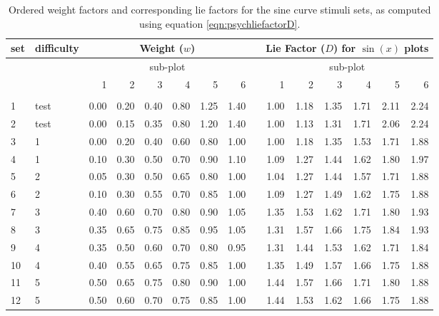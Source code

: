 \documentclass[11pt]{isuthesis}\usepackage[]{graphicx}\usepackage[]{color}
\begin{document}
\begin{table}[ht]
\centering
\caption{\label{tab:w} Ordered weight factors and corresponding lie factors for the sine curve stimuli sets, as computed using equation \ref{eqn:psychliefactorD}.}
\begin{tabular}{llrrrrrrlrrrrrr}
  \hline
set \vphantom{hp}& difficulty & \multicolumn{6}{c}{Weight ($w$)} & & \multicolumn{6}{c}{Lie Factor ($D$) for $\sin(x)$ plots}\\ 
\hline
& & \multicolumn{6}{c}{sub-plot} & & \multicolumn{6}{c}{sub-plot}\\ 
    & & 1 & 2 & 3 & 4 & 5 & 6  & & 1 & 2 & 3 & 4 & 5 & 6  \\ 
    \cline{3-8} \cline{10-15}\\ [-1.75ex]
  1 & test & 0.00 & 0.20 & 0.40 & 0.80 & 1.25 & 1.40 &       & 1.00 & 1.18 & 1.35 & 1.71 & 2.11 & 2.24 \\ 
  2 & test & 0.00 & 0.15 & 0.35 & 0.80 & 1.20 & 1.40 &       & 1.00 & 1.13 & 1.31 & 1.71 & 2.06 & 2.24 \\ 
  3 & 1 & 0.00 & 0.20 & 0.40 & 0.60 & 0.80 & 1.00 &       & 1.00 & 1.18 & 1.35 & 1.53 & 1.71 & 1.88 \\ 
  4 & 1 & 0.10 & 0.30 & 0.50 & 0.70 & 0.90 & 1.10 &       & 1.09 & 1.27 & 1.44 & 1.62 & 1.80 & 1.97 \\ 
  5 & 2 & 0.05 & 0.30 & 0.50 & 0.65 & 0.80 & 1.00 &       & 1.04 & 1.27 & 1.44 & 1.57 & 1.71 & 1.88 \\ 
  6 & 2 & 0.10 & 0.30 & 0.55 & 0.70 & 0.85 & 1.00 &       & 1.09 & 1.27 & 1.49 & 1.62 & 1.75 & 1.88 \\ 
  7 & 3 & 0.40 & 0.60 & 0.70 & 0.80 & 0.90 & 1.05 &       & 1.35 & 1.53 & 1.62 & 1.71 & 1.80 & 1.93 \\ 
  8 & 3 & 0.35 & 0.65 & 0.75 & 0.85 & 0.95 & 1.05 &       & 1.31 & 1.57 & 1.66 & 1.75 & 1.84 & 1.93 \\ 
  9 & 4 & 0.35 & 0.50 & 0.60 & 0.70 & 0.80 & 0.95 &       & 1.31 & 1.44 & 1.53 & 1.62 & 1.71 & 1.84 \\ 
  10 & 4 & 0.40 & 0.55 & 0.65 & 0.75 & 0.85 & 1.00 &       & 1.35 & 1.49 & 1.57 & 1.66 & 1.75 & 1.88 \\ 
  11 & 5 & 0.50 & 0.65 & 0.75 & 0.80 & 0.90 & 1.00 &       & 1.44 & 1.57 & 1.66 & 1.71 & 1.80 & 1.88 \\ 
  12 & 5 & 0.50 & 0.60 & 0.70 & 0.75 & 0.85 & 1.00 &       & 1.44 & 1.53 & 1.62 & 1.66 & 1.75 & 1.88 \\ 
   \hline
\end{tabular}
\end{table}
\end{document}
